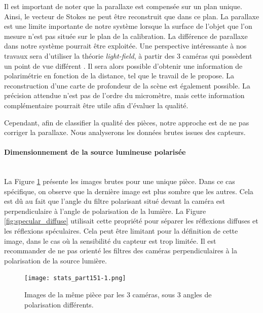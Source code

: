 Il est important de noter que la parallaxe est compensée sur un plan unique.
Ainsi, le vecteur de Stokes ne peut être reconstruit que dans ce plan.
La parallaxe est une limite importante de notre système lorsque la surface de l'objet que l'on mesure n'est pas située sur le plan de la calibration.
La différence de parallaxe dans notre système pourrait être exploitée.
Une perspective intéressante à nos travaux sera d'utiliser la théorie \textit{light-field}, à partir des 3 caméras qui possèdent un point de vue différent \cite{wilburn_high_2005}.
Il sera alors possible d'obtenir une information de polarimétrie en fonction de la distance, tel que le travail de \citeauthor{gendre_interest_2018} \cite{gendre_interest_2018} le propose.
La reconstruction d'une carte de profondeur de la scène est également possible.
La précision attendue n'est pas de l'ordre du micromètre, mais cette information complémentaire pourrait être utile afin d'évaluer la qualité.

Cependant, afin de classifier la qualité des pièces, notre approche est de ne pas corriger la parallaxe.
Nous analyserons les données brutes issues des capteurs.


\paragraph{Dimensionnement de la source lumineuse polarisée}\mbox{} \\
La Figure \ref{fig:raw_measures} présente les images brutes pour une unique pièce.
Dans ce cas spécifique, on observe que la dernière image est plus sombre que les autres.
Cela est dû au fait que l'angle du filtre polarisant situé devant la caméra est perpendiculaire à l'angle de polarisation de la lumière.
La Figure \ref{fig:specular_diffuse} utilisait cette propriété pour séparer les réflexions diffuses et les réflexions spéculaires.
Cela peut être limitant pour la définition de cette image, dans le cas où la sensibilité du capteur est trop limitée.
Il est recommander de ne pas orienté les filtres des caméras perpendiculaires à la polarisation de la source lumière.

\begin{figure}[bthp]
	\centering
	\texttt{[image: stats\_part151-1.png]}
	\caption{Images de la même pièce par les 3 caméras, sous 3 angles de polarisation différents.}
	\label{fig:raw_measures}
\end{figure}


